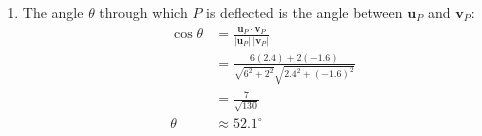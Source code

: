 \documentclass[leqno]{article}
\begin{document}
\begin{enumerate}[
  label=\textbf{\arabic*.},
  leftmargin=*,
  topsep=0pt,
  partopsep=0pt,
  parsep=0pt
]
\begin{djsSolution}
\begin{enumerate}[label=\textbf{(\alph*)}, start=1]
\begin{enumerate}[label=(\roman*), start=1]
\item From the loss of kinetic energy in part (a)(i):
\[
e=\frac12
\]

\end{enumerate}
\item The angle \(\theta\) through which \(P\) is deflected is the angle between \(\mathbf{u}_P\) and \(\mathbf{v}_P\):
\begin{align*}
\cos\theta&=\frac{\mathbf{u}_P\cdot\mathbf{v}_P}{|\mathbf{u}_P|\,|\mathbf{v}_P|}\\
&=\frac{6(2.4)+2(-1.6)}{\sqrt{6^2+2^2}\sqrt{2.4^2+(-1.6)^2}}\\
&=\frac{7}{\sqrt{130}}\\
\theta&\approx52.1^\circ
\end{align*}

\end{enumerate}
\end{djsSolution}

\end{enumerate}
\end{document}
